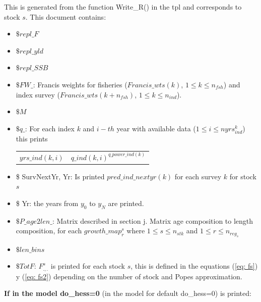 \documentclass{article}
\newcounter{subsubsubsection}[subsubsection]
\begin{document}
     This is generated from the function Write\_R() in the tpl and corresponds to stock $s$. This document contains: 
    \begin{itemize}
        \item $\$ repl\_F$
        \item $\$ repl\_yld$
        \item $\$ repl\_SSB$
        \item $\$ FW\_$: Francis weights for fisheries ($Francis\_wts(k)$, $1\leq k \leq n_{fsh}$) and index survey ($Francis\_wts(k+n_{fsh})$, $1\leq k \leq n_{ind}$).
    
        \item $\$ M$ 
        \item $\$ q\_$: For each index $k$ and $i-th$ year with available data ($1\leq 
 i \leq nyrs^k_{ind}$) this prints
 \begin{center}
 \begin{tabular}{r l}
    $yrs\_ind(k,i)$  & ${q\_ind(k,i)}^{q\_power\_ind(k)}$
     \end{tabular}
\end{center}
    \item \$ SurvNextYr, Yr: Is printed $pred\_ind\_nextyr(k)$ for each survey $k$ for stock $s$
    \item \$ Yr: the years from $y_0$ to $y_N$ are printed.
    \item $\$ P\_age2len\_$: Matrix described in section j. Matrix age composition to length composition, for each $growth\_map^s_r$ where $1\leq s \leq n_{stk}$ and $1\leq r \leq n_{reg_s}$
    
    \item $\$ len\_bins$
    \item $\$ TotF$: 
 $F^s_{.,.}$ is printed for each stock $s$, this is defined in the equations (\ref{eq: fs}) y (\ref{eq: fs2}) depending on the number of stock and Popes approximation.

 \end{itemize}
 \textbf{If in the model do\_hess=0} (in the model for default do\_hess=0) is printed:\\
 
\end{document}
